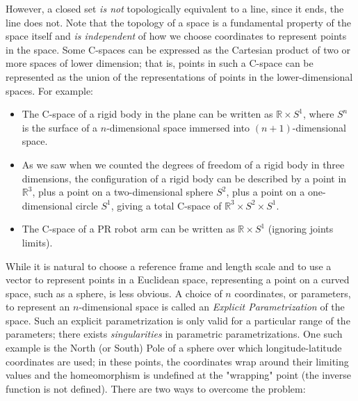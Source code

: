         However, a closed set \textit{is not} topologically equivalent to a line, since it ends, the line does not. Note that the topology of a space is a fundamental property of the space itself and \textit{is independent} of how we choose coordinates to represent points in the space.
        Some C-spaces can be expressed as the Cartesian product of two or more spaces of lower dimension; that is, points in such a C-space can be represented as the union of the representations of points in the lower-dimensional spaces. For example:
        \begin{itemize}
            \item The C-space of a rigid body in the plane can be written as $\mathbb{R}\times S^1$, where $S^n$ is the surface of a $n$-dimensional space immersed into $(n+1)$-dimensional space.
            \item As we saw when we counted the degrees of freedom of a rigid body in three dimensions, the configuration of a rigid body can be described by a point in $\mathbb{R}^3$, plus a point on a two-dimensional sphere $S^2$, plus a point on a one-dimensional circle $S^1$, giving a total C-space of $\mathbb{R}^3 \times S^2 \times S^1$.
            \item The C-space of a PR robot arm can be written as $\mathbb{R}\times S^1$ (ignoring joints limits). 
        \end{itemize}
        While it is natural to choose a reference frame and length scale and to use a vector to represent points in a Euclidean space, representing a point on a curved space, such as a sphere, is less obvious. A choice of $n$ coordinates, or parameters, to represent an $n$-dimensional space is called an \textit{Explicit Parametrization} of the space. Such an explicit parametrization is only valid for a particular range of the parameters; there exists \textit{singularities} in parametric parametrizations. One such example is the North (or South) Pole of a sphere over which longitude-latitude coordinates are used; in these points, the coordinates wrap around their limiting values and the homeomorphism is undefined at the "wrapping" point (the inverse function is not defined). There are two ways to overcome the problem:
